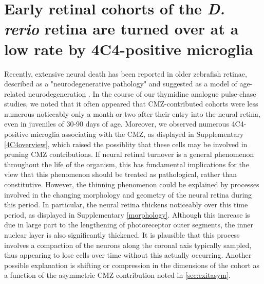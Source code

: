 \section{Early retinal cohorts of the \textit{D. rerio} retina are turned over at a low rate by 4C4-positive microglia}
\label{sec:neuralfate}
Recently, extensive neural death has been reported in older zebrafish retinae, described as a "neurodegenerative pathology" and suggested as a model of age-related neurodegeneration \cite{Vanhoucke2018}. In the course of our thymidine analogue pulse-chase studies, we noted that it often appeared that CMZ-contributed cohorts were less numerous noticeably only a month or two after their entry into the neural retina, even in juveniles of 30-90 days of age. Moreover, we observed numerous 4C4-positive microglia associating with the CMZ, as displayed in Supplementary \autoref{4C4overview}, which raised the possiblity that these cells may be involved in pruning CMZ contributions. If neural retinal turnover is a general phenomenon throughout the life of the organism, this has fundamental implications for the view that this phenomenon should be treated as pathological, rather than constitutive. However, the thinning phenomenon could be explained by processes involved in the changing morphology and geometry of the neural retina during this period. In particular, the neural retina thickens noticeably over this time period, as displayed in Supplementary \autoref{morphology}. Although this increase is due in large part to the lengthening of photoreceptor outer segments, the inner nuclear layer is also significantly thickened. It is plausible that this process involves a compaction of the neurons along the coronal axis typically sampled, thus appearing to lose cells over time without this actually occurring. Another possible explanation is shifting or compression in the dimensions of the cohort as a function of the asymmetric CMZ contribution noted in \autoref{sec:exitasym}.

